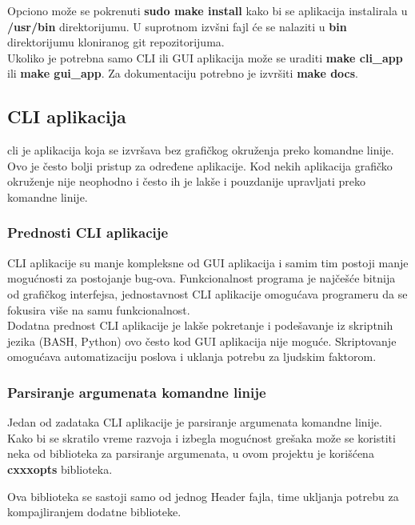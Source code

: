 Opciono može se pokrenuti \textbf{sudo make install} kako bi se aplikacija instalirala u \textbf{/usr/bin}
direktorijumu. U suprotnom izvšni fajl će se nalaziti u \textbf{bin} direktorijumu
kloniranog git repozitorijuma. \\

Ukoliko je potrebna samo CLI ili GUI aplikacija može se uraditi \textbf{make cli\_app}
ili \textbf{make gui\_app}. Za dokumentaciju potrebno je izvršiti \textbf{make docs}.

\subsection{CLI aplikacija}

\gls{cli} je aplikacija koja se izvršava bez grafičkog okruženja preko komandne linije.
Ovo je često bolji pristup za određene aplikacije.
Kod nekih aplikacija grafičko okruženje nije neophodno i često ih je
lakše i pouzdanije upravljati preko komandne linije. \\

\subsubsection{Prednosti CLI aplikacije}
CLI aplikacije su manje kompleksne od GUI aplikacija i
samim tim postoji manje mogućnosti za postojanje bug-ova.
Funkcionalnost programa je najčešće bitnija od grafičkog interfejsa,
jednostavnost CLI aplikacije omogućava programeru da se fokusira više na samu
funkcionalnost. \\

Dodatna prednost CLI aplikacije je lakše pokretanje i podešavanje iz
skriptnih jezika (BASH, Python) ovo često kod GUI aplikacija nije moguće.
Skriptovanje omogućava automatizaciju poslova i uklanja potrebu za ljudskim faktorom.\\

\subsubsection{Parsiranje argumenata komandne linije}

Jedan od zadataka CLI aplikacije je parsiranje argumenata komandne linije.
Kako bi se skratilo vreme razvoja i izbegla mogućnost grešaka može se koristiti
neka od biblioteka za parsiranje argumenata, u ovom projektu je korišćena
\textbf{cxxxopts}\cite{cxxopts} biblioteka.

Ova biblioteka se sastoji samo od jednog Header fajla, time ukljanja potrebu za
kompajliranjem dodatne biblioteke.
\newpage

